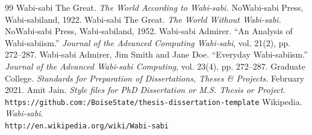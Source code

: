 \documentclass[dissertation]{bsu-cs}  %
\begin{document}
%
%




% 

%
%



\begin{thebibliography}{99}
\label{references}
 Wabi-sabi The Great. \emph{The World According to Wabi-sabi.} NoWabi-sabi
Press, Wabi-sabiland, 1922.
 Wabi-sabi The Great. \emph{The World Without Wabi-sabi.} NoWabi-sabi
Press, Wabi-sabiland, 1952.
 Wabi-sabi Admirer. ``An Analysis of Wabi-sabiism.'' \emph{Journal of the
Advanced Computing Wabi-sabi}, vol. 21(2), pp. 272--287.
 Wabi-sabi Admirer, Jim Smith and Jane Doe. ``Everyday
Wabi-sabiism.'' \emph{Journal of the Advanced Wabi-sabi Computing}, vol. 23(4), pp. 272--287.
 Graduate College. \emph{Standards for Preparation of Dissertations, Theses \&
Projects.} February 2021.
 Amit Jain. \emph{Style files for PhD Dissertation or M.S. Thesis or Project}.\\
\texttt{https://github.com:/BoiseState/thesis-dissertation-template}
 Wikipedia. \emph{Wabi-sabi}.\\
\texttt{http://en.wikipedia.org/wiki/Wabi-sabi}
\end{thebibliography}


%
%
\end{document}
